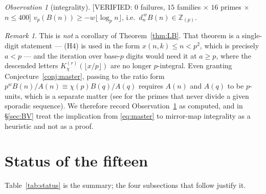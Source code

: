 \documentclass[11pt,reqno]{amsart}
\theoremstyle{plain}
\theoremstyle{definition}
\theoremstyle{remark}
\newtheorem{remark}[theorem]{Remark}
\newtheorem{observation}[theorem]{Observation}
\newcommand{\Z}{\mathbb{Z}}
\newcommand{\Zp}{\Z_{(p)}}
\newcommand{\vp}{v_p}
\newcommand{\KK}[3]{K^{(#1)}_{#2}\!\left(#3\right)}
\newcommand{\VerifiedR}[1]{\textup{\textsf{[VERIFIED: #1]}}}
\numberwithin{equation}{section}
\begin{document}
\begin{observation}[integrality]\label{obs:integrality}
\VerifiedR{$0$ failures, $15$ families $\times$ $16$ primes $\times$ $n\le400$}
$\vp(B(n))\ge-w\lfloor\log_pn\rfloor$, i.e.\ $d_n^{\,w}B(n)\in\Zp$.
\end{observation}

\begin{remark}\label{rem:integrality}
This is \emph{not} a corollary of Theorem~\ref{thm:LB}. That theorem is a single-digit
statement --- (H4) is used in the form $x(n,k)\le n<p^2$, which is precisely $a<p$ --- and
the iteration over base-$p$ digits would need it at $a\ge p$, where the descended letters
$\KK r\chi{\lfloor x/p\rfloor}$ are no longer $p$-integral. Even granting
Conjecture~\ref{conj:master}, passing to the ratio form
$p^{w}B(n)/A(n)\equiv\chi(p)B(q)/A(q)$ requires $A(n)$ and $A(q)$ to be $p$-units, which is
a separate matter (see \cite{MalikStraub} for the primes that never divide a given
sporadic sequence). We therefore record Observation~\ref{obs:integrality} as computed, and
in \S\ref{sec:BV} treat the implication from \eqref{eq:master} to mirror-map integrality as
a heuristic and not as a proof.
\end{remark}

\section{Status of the fifteen}\label{sec:status}

Table~\ref{tab:status} is the summary; the four subsections that follow justify it.
\end{document}

